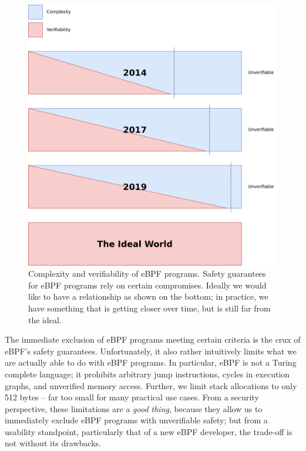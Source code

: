 \documentclass[
  12pt]{findlay}
\begin{document}
\begin{figure}[p]
    \caption[Complexity and verifiability of eBPF programs.]{
        Complexity and verifiability of eBPF programs.
        Safety guarantees for eBPF programs rely on certain compromises.
        Ideally we would like to have a relationship as shown on the bottom;
        in practice, we have something that is getting closer over time, but is still
        far from the ideal.
    }
    \label{complexity-verifiability}
    \includegraphics[height=.4\textheight]{../figures/complexity-verifiability.png}
\end{figure}

The immediate exclusion of eBPF programs meeting certain criteria is the
crux of eBPF's safety guarantees. Unfortunately, it also rather
intuitively limits what we are actually able to do with eBPF programs.
In particular, eBPF is not a Turing complete language; it prohibits
arbitrary jump instructions, cycles in execution graphs, and unverified
memory access. Further, we limit stack allocations to only 512 bytes --
far too small for many practical use cases. From a security perspective,
these limitations are a \emph{good thing}, because they allow us to
immediately exclude eBPF programs with unverifiable safety; but from a
usability standpoint, particularly that of a new eBPF developer, the
trade-off is not without its drawbacks.
\end{document}

